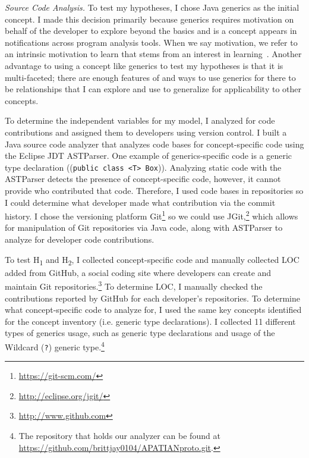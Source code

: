 \documentclass{llncs}
\begin{document}
\vspace{0.5em}
\noindent\textit{Source Code Analysis.}
To test my hypotheses, I chose Java generics as the initial concept. I made this decision primarily because generics requires motivation on behalf of the developer to explore beyond the basics and is a concept appears in notifications across program analysis tools. When we say motivation, we refer to an intrinsic motivation to learn that stems from an interest in learning~\cite{krapp1999interest,hall2008we}.		
Another advantage to using a concept like generics to test my hypotheses is that it is multi-faceted; there are enough features of and ways to use generics for there to be relationships that I can explore and use to generalize for applicability to other concepts.

To determine the independent variables for my model, I analyzed for code contributions and assigned them to developers using version control. 
I built a Java source code analyzer that analyzes code bases for concept-specific code using the Eclipse JDT ASTParser. 
One example of generics-specific code is a generic type declaration ((\texttt{public class <T> Box})).
Analyzing static code with the ASTParser detects the presence of concept-specific code, however, it cannot provide who contributed that code. 	
Therefore, I used code bases in repositories so I could determine what developer made what contribution via the commit history. 
I chose the versioning platform Git\footnote{\url{https://git-scm.com/}} so we could use JGit,\footnote{\url{http://eclipse.org/jgit/}} which allows for manipulation of Git repositories via Java code, along with ASTParser to analyze for developer code contributions.

To test H\textsubscript{1} and H\textsubscript{2}, I collected concept-specific code and manually collected LOC added from GitHub, a social coding site where developers can create and maintain Git repositories.\footnote{\url{http://www.github.com}} To determine LOC, I manually checked the contributions reported by GitHub for each developer's repositories. To determine what concept-specific code to analyze for, I used the same key concepts identified for the concept inventory (i.e. generic type declarations). I collected 11 different types of generics usage, such as generic type declarations and usage of the Wildcard (\texttt{?}) generic type.\footnote{The repository that holds our analyzer can be found at \url{https://github.com/brittjay0104/APATIANproto.git}.}
\end{document}
